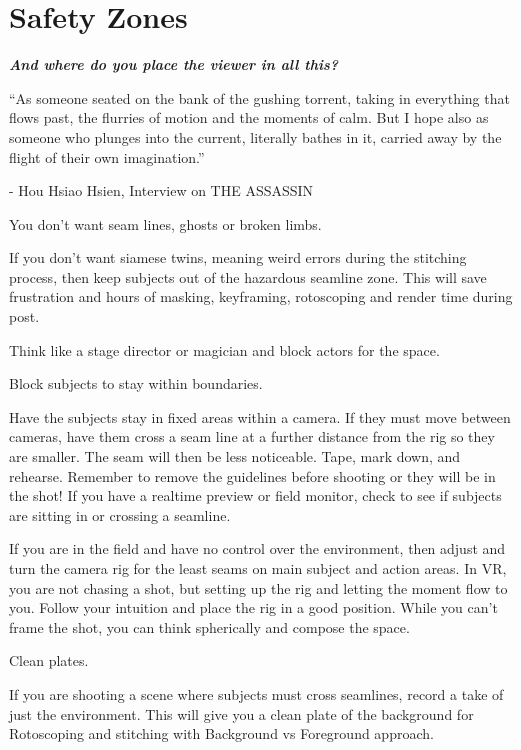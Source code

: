 \chapter{Safety Zones}
\pagecolor{white}
\label{chap:23}
\begin{fullwidth}


{\itshape\bfseries And where do you place the viewer in all this?

“As someone seated on the bank of the gushing torrent, taking in everything that flows past, the flurries of motion and the moments of calm. But I hope also as someone who plunges into the current, literally bathes in it, carried away by the flight of their own imagination.”}

- Hou Hsiao Hsien, Interview on THE ASSASSIN
\vspace{\baselineskip}

\problem

{\large You don’t want seam lines, ghosts or broken limbs. \par}

If you don’t want siamese twins, meaning weird errors during the stitching process, then keep subjects out of the hazardous seamline zone. This will save frustration and hours of masking, keyframing, rotoscoping and render time during post. 

Think like a stage director or magician and block actors for the space. 


\solution

{\large Block subjects to stay within boundaries. \par}

Have the subjects stay in fixed areas within a camera. If they must move between cameras, have them cross a seam line at a further distance from the rig so they are smaller. The seam will then be less noticeable. Tape, mark down, and rehearse. Remember to remove the guidelines before shooting or they will be in the shot! If you have a realtime preview or field monitor, check to see if subjects are sitting in or crossing a seamline. 
\clearpage
{}

If you are in the field and have no control over the environment, then adjust and turn the camera rig for the least seams on main subject and action areas. In VR, you are not chasing a shot, but setting up the rig and letting the moment flow to you. Follow your intuition and place the rig in a good position. While you can’t frame the shot, you can think spherically and compose the space. 

{\large Clean plates. \par}

If you are shooting a scene where subjects must cross seamlines, record a take of just the environment. This will give you a clean plate of the background for Rotoscoping and stitching with Background vs Foreground approach. 


\clearpage
\end{fullwidth}
